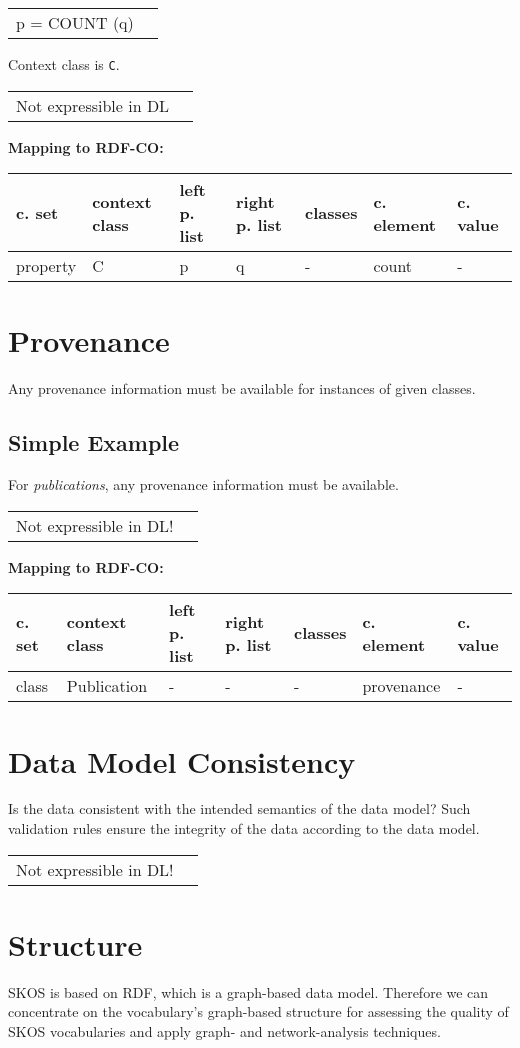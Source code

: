 \documentclass{llncs}
\newcommand{\ms}[1]{\texttt{#1}}
\newenvironment{gcotable}{
  \scriptsize
  \sffamily
  \vspace{0cm}
	\begin{center}
	\textbf{\vspace{0.4cm}Mapping to RDF-CO:} \\
  \begin{tabular}{l|l|l|l|l|l|l}
	\hline
  \textbf{c. set} & \textbf{context class} & \textbf{left p. list} & \textbf{right p. list} & \textbf{classes} & \textbf{c. element} & \textbf{c. value} \\
  \hline

}{
  \hline
  \end{tabular}
	\end{center}
}
\newenvironment{DL}{
\vspace{0cm}
	\begin{center}
  \begin{tabular}{r l}

}{
  \end{tabular}
	\end{center}
}
\begin{document}
\begin{DL}
p = COUNT (q)
\end{DL}

Context class is \ms{C}.

\begin{DL}
Not expressible in DL
\end{DL}

\begin{gcotable}
property & C & p & q & - & count & - \\
\end{gcotable}

\section{Provenance}

Any provenance information must be available for instances of given classes.

\subsection{Simple Example}

For \emph{publications}, any provenance information must be available.

\begin{DL}
Not expressible in DL!
\end{DL}

\begin{gcotable}
class & Publication & - & - & - & provenance & - \\
\end{gcotable}

\section{Data Model Consistency}

Is the data consistent with the intended semantics of the data model?
Such validation rules ensure the integrity of the data according to the data model.

\begin{DL}
Not expressible in DL!
\end{DL}

\section{Structure}

SKOS is based on RDF, which is a graph-based data model. Therefore we can concentrate on the vocabulary's graph-based structure for assessing the quality of SKOS vocabularies and apply graph- and network-analysis techniques. 
\end{document}

